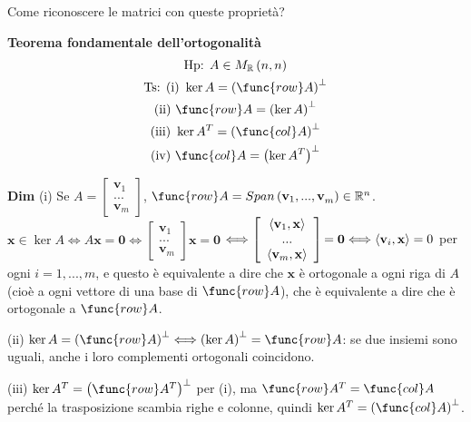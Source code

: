 \documentclass{article}
\begin{document}
Come riconoscere le matrici con queste propriet\`{a}?

\textbf{Teorema fondamentale dell'ortogonalit\`{a}} 
\begin{gather*}
\text{Hp}\text{: }A\in M_{%
\mathbb{R}
}\left( n,n\right) \\
\text{Ts}\text{: (i) }\ker A=\left( \func{row}A\right) ^{\perp } \\
\text{(ii) }\func{row}A=\left( \ker A\right) ^{\perp } \\
\text{(iii) }\ker A^{T}=\left( \func{col}A\right) ^{\perp } \\
\text{(iv) }\func{col}A=\left( \ker A^{T}\right) ^{\perp }
\end{gather*}

\textbf{Dim} (i) Se $A=\left[ 
\begin{array}{c}
\mathbf{v}_{1} \\ 
... \\ 
\mathbf{v}_{m}%
\end{array}%
\right] $, $\func{row}A=Span\left( \mathbf{v}_{1}\mathbf{,...,v}_{m}\right)
\in 
\mathbb{R}
^{n}$. $\mathbf{x}\in \ker A\Longleftrightarrow A\mathbf{x=0}%
\Longleftrightarrow \left[ 
\begin{array}{c}
\mathbf{v}_{1} \\ 
... \\ 
\mathbf{v}_{m}%
\end{array}%
\right] \mathbf{x=0}$ $\Longleftrightarrow \left[ 
\begin{array}{c}
\langle \mathbf{v}_{1},\mathbf{x\rangle } \\ 
... \\ 
\langle \mathbf{v}_{m}\mathbf{,x}\rangle%
\end{array}%
\right] \mathbf{=0}\Longleftrightarrow \langle \mathbf{v}_{i},\mathbf{%
x\rangle }=0$ per ogni $i=1,...,m$, e questo \`{e} equivalente a dire che $%
\mathbf{x}$ \`{e} ortogonale a ogni riga di $A$ (cio\`{e} a ogni vettore di
una base di $\func{row}A$), che \`{e} equivalente a dire che \`{e}
ortogonale a $\func{row}A$.

(ii) $\ker A=\left( \func{row}A\right) ^{\perp }\Longleftrightarrow \left(
\ker A\right) ^{\perp }=\func{row}A$: se due insiemi sono uguali, anche i
loro complementi ortogonali coincidono.

(iii) $\ker A^{T}=\left( \func{row}A^{T}\right) ^{\perp }$ per (i), ma $%
\func{row}A^{T}=\func{col}A$ perch\'{e} la trasposizione scambia righe e
colonne, quindi $\ker A^{T}=\left( \func{col}A\right) ^{\perp }$.
\end{document}
